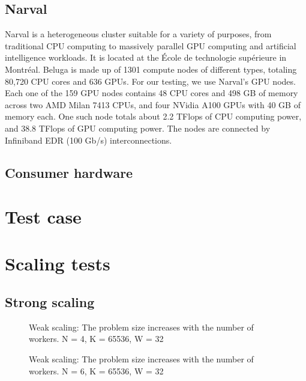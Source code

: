 \subsection{Narval} \label{section:results:platforms:narval}
Narval is a heterogeneous cluster suitable for a variety of purposes, from traditional CPU computing
to massively parallel GPU computing and artificial intelligence workloads. It is located at the
École de technologie supérieure in Montréal. Beluga is made up of 1301 compute nodes of different
types, totaling 80,720 CPU cores and 636 GPUs. For our testing, we use Narval's GPU nodes. Each one
of the 159 GPU nodes contains 48 CPU cores and 498 GB of memory across two AMD Milan 7413 CPUs, and
four NVidia A100 GPUs with 40 GB of memory each. One such node totals about 2.2 TFlops of CPU
computing power, and 38.8 TFlops of GPU computing power. The nodes are connected by Infiniband EDR
(100 Gb/s) interconnections.

\subsection{Consumer hardware} \label{section:results:platforms:consumer}

\section{Test case} \label{section:results:test_case}

\section{Scaling tests} \label{section:results:scaling_tests}

\subsection{Strong scaling} \label{section:results:scaling_tests:strong}

\begin{figure}[H]
	\centering
	
	\caption{Weak scaling: The problem size increases with the number of workers. N = 4, K = 65536, W = 32}
	\label{fig:strong_scaling_N4_W32}
\end{figure}

\begin{figure}[H]
	\centering
	
	\caption{Weak scaling: The problem size increases with the number of workers. N = 6, K = 65536, W = 32}
	\label{fig:strong_scaling_N6_W32}
\end{figure}


